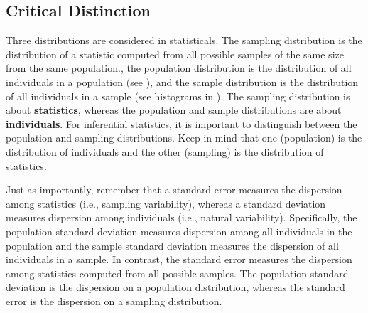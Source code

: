 \documentclass[10pt,openany]{book}\usepackage[]{graphicx}\usepackage[]{color}
\begin{document}
\vspace{-18pt}
\subsection{Critical Distinction}
\vspace{-12pt}
Three distributions are considered in statisticals.  The sampling distribution is the distribution of a statistic computed from all possible samples of the same size from the same population., the population distribution is the distribution of all individuals in a population (see ), and the sample distribution is the distribution of all individuals in a sample (see histograms in ).  The sampling distribution is about \textbf{statistics}, whereas the population and sample distributions are about \textbf{individuals}. For inferential statistics, it is important to distinguish between the population and sampling distributions. Keep in mind that one (population) is the distribution of individuals and the other (sampling) is the distribution of statistics.

Just as importantly, remember that a standard error measures the dispersion among statistics (i.e., sampling variability), whereas a standard deviation measures dispersion among individuals (i.e., natural variability).  Specifically, the population standard deviation measures dispersion among all individuals in the population and the sample standard deviation measures the dispersion of all individuals in a sample.  In contrast, the standard error measures the dispersion among statistics computed from all possible samples.  The population standard deviation is the dispersion on a population distribution, whereas the standard error is the dispersion on a sampling distribution.


\vspace{-12pt}
\end{document}
